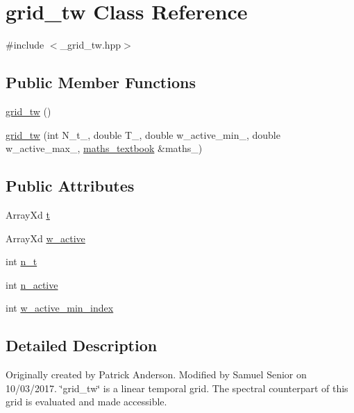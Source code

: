 \hypertarget{classgrid__tw}{}\section{grid\+\_\+tw Class Reference}
\label{classgrid__tw}


{\ttfamily \#include $<$\+\_\+grid\+\_\+tw.\+hpp$>$}

\subsection*{Public Member Functions}
\begin{DoxyCompactItemize}
\item 
\hyperlink{classgrid__tw_af1e2316561c84a2262e374600895010d}{grid\+\_\+tw} ()
\item 
\hyperlink{classgrid__tw_a583d4c2b423305ef3806d6221ed3f543}{grid\+\_\+tw} (int N\+\_\+t\+\_\+, double T\+\_\+, double w\+\_\+active\+\_\+min\+\_\+, double w\+\_\+active\+\_\+max\+\_\+, \hyperlink{classmaths__textbook}{maths\+\_\+textbook} \&maths\+\_\+)
\end{DoxyCompactItemize}
\subsection*{Public Attributes}
\begin{DoxyCompactItemize}
\item 
Array\+Xd \hyperlink{classgrid__tw_a918f1e6d18056d0f6da08fe01089b9b0}{t}
\item 
Array\+Xd \hyperlink{classgrid__tw_a66922766c9dfe5c4667e55e678b134b9}{w\+\_\+active}
\item 
int \hyperlink{classgrid__tw_ac121ce740479f628bdaa54627540ad42}{n\+\_\+t}
\item 
int \hyperlink{classgrid__tw_a1fbf854a0f7bd025aa98671009602c5c}{n\+\_\+active}
\item 
int \hyperlink{classgrid__tw_a27d987fb3c8cbacf9cd152b83477f0d9}{w\+\_\+active\+\_\+min\+\_\+index}
\end{DoxyCompactItemize}


\subsection{Detailed Description}
Originally created by Patrick Anderson. Modified by Samuel Senior on 10/03/2017. \char`\"{}grid\+\_\+tw\char`\"{} is a linear temporal grid. The spectral counterpart of this grid is evaluated and made accessible. 

